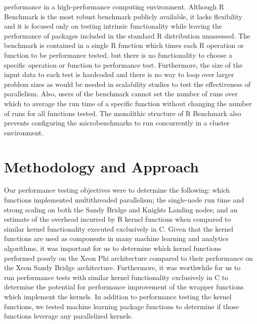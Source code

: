 performance in a high-performance computing environment. Although R Benchmark is the most
robust benchmark publicly available, it lacks flexibility and it is focused only on
testing intrinsic functionality while leaving the performance of packages included in the
standard R distribution unassessed.  The benchmark is contained in a single R function
which times each R operation or function to be performance tested, but there is no
functionality to choose a specific operation or function to performance test.
Furthermore, the size of the input data to each test is hardcoded and there is no way to
loop over larger problem sizes as would be needed in scalability studies to test the
effectiveness of parallelism.  Also, users of the benchmark cannot set the number of runs
over which to average the run time of a specific function without changing the number of
runs for all functions tested.  The monolithic structure of R Benchmark also prevents
configuring the microbenchmarks to run concurrently in a cluster environment.


\section{Methodology and Approach}
Our performance testing objectives were to determine the following: which
  functions implemented multithreaded parallelism; the single-node
  run time and strong scaling on both the Sandy Bridge and Knights
  Landing nodes; and an estimate of the overhead incurred by R kernel functions
  when compared to similar kernel functionality executed exclusively in C.
Given that the kernel functions are used as components in many machine learning
  and analytics algorithms, it was important for us to determine which kernel
  functions performed poorly on the Xeon Phi architecture compared to their
  performance on the Xeon Sandy Bridge architecture.
Furthermore, it was worthwhile for us to run performance tests with
  similar kernel functionality exclusively in C to determine the potential
  for performance improvement of the wrapper functions which implement the
  kernels.
In addition to performance testing the kernel functions, we tested machine
  learning package functions to determine if those functions leverage any
  parallelized kernels.

